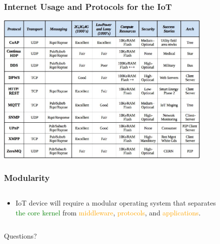 \documentclass{beamer}
\begin{document}
\begin{frame}
	\frametitle{Internet Usage and Protocols for the IoT}
	\vspace{.25cm}
	\hspace*{.75cm} \includegraphics[width=10.5cm]{figs/iot-network-protocols.jpeg}
\end{frame}

\begin{frame}
	\frametitle{Modularity}
	\begin{columns}[c]
		\begin{column}{30cm}
			\vspace{.1cm}
			\begin{itemize}
				\justifying
				\item IoT device will require a modular operating system that separates\\
				\textcolor{green}{the core kernel} from
				\textcolor{orange}{middleware},
				\textcolor{orange}{protocols},
				and \textcolor{orange}{applications}.
			\end{itemize}
		\end{column}
	\end{columns}
	\vspace{.5cm}
	\hspace*{5.5cm}
\end{frame}

\begin{frame}
	\vspace{1cm}
	\begin{Huge}
		\begin{center}
			Questions?
		\end{center}
	\end{Huge}
\end{frame}
\end{document}
